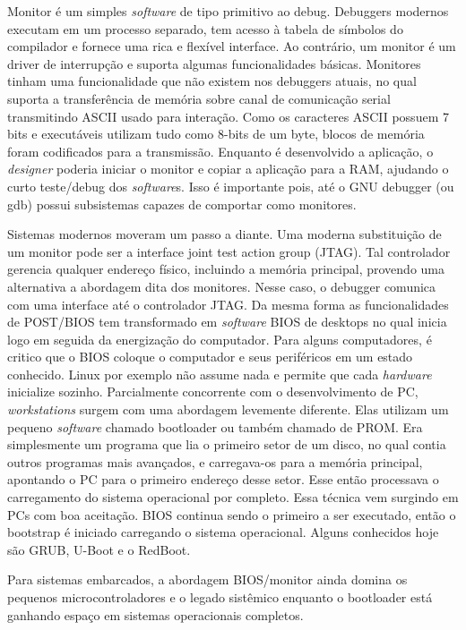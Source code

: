 Monitor é um simples \textit{software} de tipo primitivo ao debug. Debuggers modernos executam em um processo separado, tem acesso à tabela de símbolos do compilador e fornece uma rica e flexível interface. Ao contrário, um monitor é um driver de interrupção e suporta algumas funcionalidades básicas. Monitores tinham uma funcionalidade que não existem nos debuggers atuais, no qual suporta a transferência de memória sobre canal de comunicação serial transmitindo ASCII usado para interação. Como os caracteres ASCII possuem 7 bits e executáveis utilizam tudo como 8-bits de um byte, blocos de memória foram codificados para a transmissão. Enquanto é desenvolvido a aplicação, o \textit{\textit{design}er} poderia iniciar o monitor e copiar a aplicação para a RAM, ajudando o curto teste/debug dos \textit{software}s. Isso é importante pois, até o GNU debugger (ou gdb) possui subsistemas capazes de comportar como monitores.

Sistemas modernos moveram um passo a diante. Uma moderna substituição de um monitor pode ser a interface joint test action group (JTAG). Tal controlador gerencia qualquer endereço físico, incluindo a memória principal, provendo uma alternativa a abordagem dita dos monitores. Nesse caso, o debugger comunica com uma interface até o controlador JTAG. Da mesma forma as funcionalidades de POST/BIOS tem transformado em \textit{software} BIOS de desktops no qual inicia logo em seguida da energização do computador. Para alguns computadores, é critico que o BIOS coloque o computador e seus periféricos em um estado conhecido. Linux por exemplo não assume nada e permite que cada \textit{hardware} inicialize sozinho. Parcialmente concorrente com o desenvolvimento de PC, \textit{\textit{workstation}s} surgem com uma abordagem levemente diferente. Elas utilizam um pequeno \textit{software} chamado bootloader ou também chamado de PROM. Era simplesmente um programa que lia o primeiro setor de um disco, no qual contia outros programas mais avançados, e carregava-os para a memória principal, apontando o PC para o primeiro endereço desse setor. Esse então processava o carregamento do sistema operacional por completo. Essa técnica vem surgindo em PCs com boa aceitação. BIOS continua sendo o primeiro a ser executado, então o bootstrap é iniciado carregando o sistema operacional. Alguns conhecidos hoje são GRUB, U-Boot e o RedBoot.

Para sistemas embarcados, a abordagem BIOS/monitor ainda domina os pequenos microcontroladores e o legado sistêmico enquanto o bootloader está ganhando espaço em sistemas operacionais completos.
